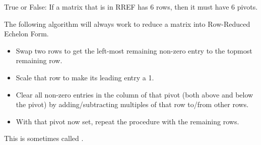 \endedxproblem




True or False: If a matrix that is in RREF has 6 rows, then it must have 6 pivots.  




\endedxproblem

\endedxvertical







The following algorithm will always work to reduce a matrix into Row-Reduced Echelon Form.  

\begin{itemize}
\item Swap two rows to get the left-most remaining non-zero entry to the topmost remaining row.  
\item Scale that row to make its leading entry a 1.    
\item Clear all non-zero entries in the column of that pivot (both above and below the pivot) by adding/subtracting multiples of that row to/from other rows.  
\item With that pivot now set, repeat the procedure with the remaining rows.  
\end{itemize}

This is sometimes called {}.  

\endedxtext



